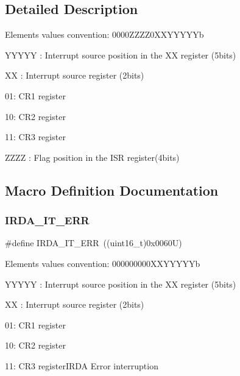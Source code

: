 \subsection{Detailed Description}
Elements values convention\+: 0000\+Z\+Z\+Z\+Z0\+X\+X\+Y\+Y\+Y\+Y\+Yb
\begin{DoxyItemize}
\item Y\+Y\+Y\+YY \+: Interrupt source position in the XX register (5bits)
\item XX \+: Interrupt source register (2bits)
\begin{DoxyItemize}
\item 01\+: C\+R1 register
\item 10\+: C\+R2 register
\item 11\+: C\+R3 register
\end{DoxyItemize}
\item Z\+Z\+ZZ \+: Flag position in the I\+SR register(4bits) 
\end{DoxyItemize}

\subsection{Macro Definition Documentation}
\mbox{\label{group___i_r_d_a___interrupt__definition_ga5649210cc5343a80483178849a11ac66}} 
\subsubsection{\texorpdfstring{I\+R\+D\+A\+\_\+\+I\+T\+\_\+\+E\+RR}{IRDA\_IT\_ERR}}
{\footnotesize\ttfamily \#define I\+R\+D\+A\+\_\+\+I\+T\+\_\+\+E\+RR~((uint16\+\_\+t)0x0060\+U)}

Elements values convention\+: 000000000\+X\+X\+Y\+Y\+Y\+Y\+Yb
\begin{DoxyItemize}
\item Y\+Y\+Y\+YY \+: Interrupt source position in the XX register (5bits)
\item XX \+: Interrupt source register (2bits)
\begin{DoxyItemize}
\item 01\+: C\+R1 register
\item 10\+: C\+R2 register
\item 11\+: C\+R3 register\+I\+R\+DA Error interruption 
\end{DoxyItemize}
\end{DoxyItemize}\mbox{\label{group___i_r_d_a___interrupt__definition_gac193cb9027e7425c022a160f172bf8b7}} 
